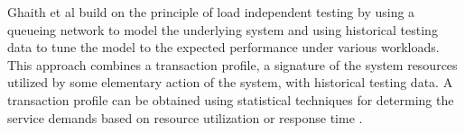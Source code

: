 Ghaith et al build on the principle of load independent testing by using a queueing network to model the underlying system and using historical testing data to tune the model to the expected performance under various workloads. \cite{ghaith2013profile} This approach combines a transaction profile, a signature of the system resources utilized by some elementary action of the system, with historical testing data. A transaction profile can be obtained using statistical techniques for determing the service demands based on resource utilization \cite{casale2008robust} or response time \cite{kraft2009estimating}.

